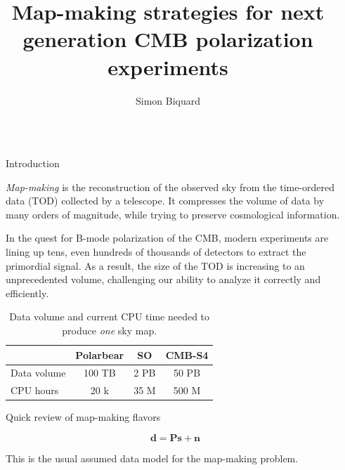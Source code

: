 \documentclass[final]{beamer}
\title{Map-making strategies for next generation CMB polarization experiments}
\author{Simon Biquard}
\institute[shortinst]{AstroParticule et Cosmologie, Paris, France}
\newlength{\sepwidth}
\newlength{\colwidth}
\newcommand{\separatorcolumn}{\begin{column}{\sepwidth}\end{column}}
\begin{document}
\begin{frame}[t]
  \begin{columns}[t]
    \separatorcolumn

    \begin{column}{\colwidth}

      \begin{block}{Introduction}

        \emph{Map-making} is the reconstruction of the observed sky from the time-ordered data (TOD) collected by a telescope.
        It compresses the volume of data by many orders of magnitude, while trying to preserve cosmological information.

        In the quest for B-mode polarization of the CMB, modern experiments are lining up tens, even hundreds of thousands of detectors to extract the primordial signal.
        As a result, the size of the TOD is increasing to an unprecedented volume, challenging our ability to analyze it correctly and efficiently.

        \begin{table}
          \centering
          \begin{tabular}{l c c c}
            \toprule
            \text{}     & \textbf{Polarbear} & \textbf{SO} & \textbf{CMB-S4} \\
            \midrule
            Data volume & 100 TB             & 2 PB        & 50 PB           \\
            CPU hours   & 20 k               & 35 M        & 500 M           \\
            \bottomrule
          \end{tabular}
          \caption{Data volume and current CPU time needed to produce \emph{one} sky map.}
        \end{table}

      \end{block}

      \begin{alertblock}{Quick review of map-making flavors}


        \begin{equation}\label{eq:data_model}
          \mathbf d = \mathbf{P s} + \mathbf n
        \end{equation}

        This is the usual assumed data model for the map-making problem.


\end{alertblock}
\end{column}
\end{columns}
\end{frame}
\end{document}
